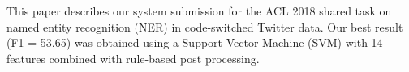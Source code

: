 This paper describes our system submission for the ACL 2018 shared task on named entity recognition (NER) in code-switched Twitter data. Our best result (F1 = 53.65) was obtained using a Support Vector Machine (SVM) with 14 features combined with rule-based post processing.
